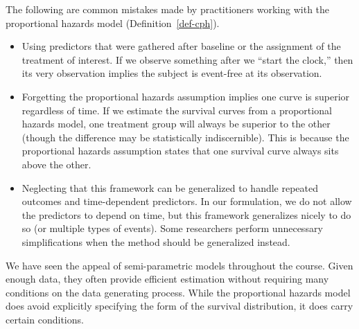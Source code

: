 \documentclass[
  letterpaper,
  DIV=11,
  numbers=noendperiod]{scrreprt}
\providecommand{\tightlist}{%
  \setlength{\itemsep}{0pt}\setlength{\parskip}{0pt}}\usepackage{longtable,booktabs,array}
\theoremstyle{definition}
\theoremstyle{definition}
\theoremstyle{remark}
\begin{document}
\begin{tcolorbox}[enhanced jigsaw, left=2mm, toprule=.15mm, arc=.35mm, breakable, opacitybacktitle=0.6, opacityback=0, rightrule=.15mm, colbacktitle=quarto-callout-note-color!10!white, coltitle=black, leftrule=.75mm, toptitle=1mm, colframe=quarto-callout-note-color-frame, titlerule=0mm, title=\textcolor{quarto-callout-note-color}{\faInfo}\hspace{0.5em}{Common Errors when Working with the Proportional Hazards Model}, bottomrule=.15mm, colback=white, bottomtitle=1mm]

The following are common mistakes made by practitioners working with the
proportional hazards model (Definition~\ref{def-cph}).

\begin{itemize}
\tightlist
\item
  Using predictors that were gathered after baseline or the assignment
  of the treatment of interest. If we observe something after we ``start
  the clock,'' then its very observation implies the subject is
  event-free at its observation.
\item
  Forgetting the proportional hazards assumption implies one curve is
  superior regardless of time. If we estimate the survival curves from a
  proportional hazards model, one treatment group will always be
  superior to the other (though the difference may be statistically
  indiscernible). This is because the proportional hazards assumption
  states that one survival curve always sits above the other.
\item
  Neglecting that this framework can be generalized to handle repeated
  outcomes and time-dependent predictors. In our formulation, we do not
  allow the predictors to depend on time, but this framework generalizes
  nicely to do so (or multiple types of events). Some researchers
  perform unnecessary simplifications when the method should be
  generalized instead.
\end{itemize}

\end{tcolorbox}

We have seen the appeal of semi-parametric models throughout the course.
Given enough data, they often provide efficient estimation without
requiring many conditions on the data generating process. While the
proportional hazards model does avoid explicitly specifying the form of
the survival distribution, it does carry certain conditions.
\end{document}
